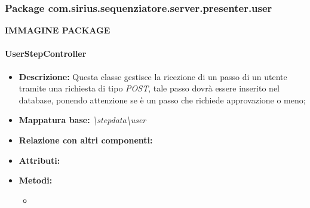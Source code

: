 \subsubsection{Package com.sirius.sequenziatore.server.presenter.user}
\textbf{IMMAGINE PACKAGE}
\paragraph{UserStepController}%
\begin{itemize}
	\item \textbf{Descrizione: } Questa classe gestisce la ricezione di un passo di un utente tramite una richiesta di tipo \textit{POST}, tale passo dovrà essere inserito nel database, ponendo attenzione se è un passo che richiede approvazione o meno;
	\item \textbf{Mappatura base: } \textit{\textbackslash stepdata\textbackslash user}
	\item \textbf{Relazione con altri componenti: }
	\item \textbf{Attributi: } 
	\item \textbf{Metodi: }\begin{itemize}
					\item 
				\end{itemize}
\end{itemize}
